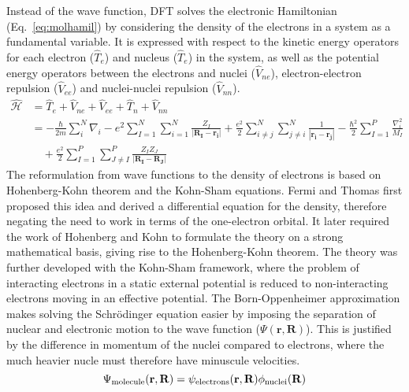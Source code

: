 Instead of the wave function, DFT solves the electronic Hamiltonian (Eq.~\ref{eq:molhamil}) by considering the density of the electrons in a system as a fundamental variable. It is expressed with respect to the kinetic energy operators for each electron ($\hat{T}_e$) and nucleus ($\hat{T}_e$) in the system, as well as the potential energy operators between the electrons and nuclei ($\hat{V}_{ne}$), electron-electron repulsion ($\hat{V}_{ee}$) and nuclei-nuclei repulsion ($\hat{V}_{nn}$). 
%
\begin{equation} \label{eq:molhamil}
\begin{split}
\hat{\mathcal{H}}  &=  \hat{T}_e + \hat{V}_{ne} + \hat{V}_{ee} + \hat{T}_{n} + \hat{V}_{nn}
\\ &= - \frac{\hbar}{2m} \sum_{i}^{N} \nabla_i - e^2 \sum_{I=1}^{N} \sum_{i=1}^{N} \frac{Z_I}{|\mathbf{R_I - r_i}|}  + \frac{e^2}{2} \sum_{i \neq j}^{N} \sum_{j \neq i}^{N} \frac{1}{|\mathbf{r_i - r_j}|} - \frac{\hbar^2}{2} \sum_{I=1}^{P} \frac{\nabla_i^2}{M_I} \\
& \quad + \frac{e^2}{2} \sum_{I=1}^{P} \sum_{J \neq I}^{P} \frac{Z_I Z_J}{|\mathbf{R_I - R_J}|}
\end{split}
\end{equation} 
%
The reformulation from wave functions to the density of electrons is based on Hohenberg-Kohn theorem and the Kohn-Sham equations. Fermi and Thomas first proposed this idea and derived a differential equation for the density,\cite{Thomas1927, fermi1927metodo} therefore negating the need to work in terms of the one-electron orbital. It later required the work of Hohenberg and Kohn to formulate the theory on a strong mathematical basis,\cite{hohkohn} giving rise to the Hohenberg-Kohn theorem. The theory was further developed with the Kohn-Sham framework,\cite{kohnsham} where the problem of interacting electrons in a static external potential is reduced to non-interacting electrons moving in an effective potential. 
%
The Born-Oppenheimer approximation makes solving the Schr\"odinger equation easier by imposing the separation of nuclear and electronic motion to the wave function ($\Psi(\mathbf{r}, \mathbf{R})$).\cite{BO} This is justified by the difference in momentum of the nuclei compared to electrons, where the much heavier nucle must therefore have minuscule velocities. 
%
\begin{equation} \label{eq:BO}
\Psi_{\rm{molecule}}(\mathbf{r}, \mathbf{R}) = \psi_{\rm{electrons}}(\mathbf{r}, \mathbf{R}) \phi_{\rm{nuclei}}(\mathbf{R})
\end{equation}
%
